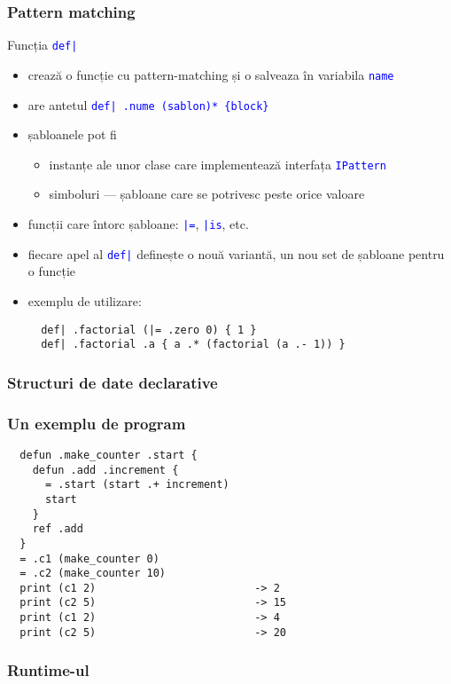 \documentclass{beamer}
\renewcommand{\c}[1]{\textcolor{blue}{\texttt{#1}}}
\begin{document}
\begin{frame}[containsverbatim]
  \frametitle{Pattern matching}
  Funcția \c{def|}
  \begin{itemize}
    \item crează o funcție cu pattern-matching și o salveaza în variabila \c{name}
    \item are antetul \c{def| .nume (sablon)* \{block\}}
    \item șabloanele pot fi
      \begin{itemize}
        \item instanțe ale unor clase care implementează interfața \c{IPattern}
        \item simboluri — șabloane care se potrivesc peste orice valoare
      \end{itemize}
    \item funcții care întorc șabloane: \c{|=}, \c{|is}, etc.
    \item fiecare apel al \c{def|} definește o nouă variantă, un nou set de șabloane pentru o funcție
    \item exemplu de utilizare:
      \color{blue}
      \begin{verbatim}
  def| .factorial (|= .zero 0) { 1 }
  def| .factorial .a { a .* (factorial (a .- 1)) }\end{verbatim}
        \color{black}
  \end{itemize}
\end{frame}

\begin{frame}
  \frametitle{Structuri de date declarative}
  
\end{frame}

\begin{frame}[containsverbatim]
  \frametitle{Un exemplu de program}
  \color{blue}
  \begin{verbatim}
  defun .make_counter .start {
    defun .add .increment {
      = .start (start .+ increment)
      start
    }
    ref .add
  }
  = .c1 (make_counter 0)
  = .c2 (make_counter 10)
  print (c1 2)                         -> 2
  print (c2 5)                         -> 15
  print (c1 2)                         -> 4
  print (c2 5)                         -> 20
  \end{verbatim}
  \color{black}
\end{frame}

\begin{frame}
  \frametitle{Runtime-ul}
  
\end{frame}
\end{document}
